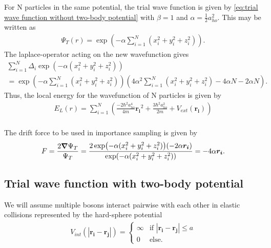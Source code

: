 For N particles in the same potential, the trial wave function is given by \autoref{eq:trial wave function without two-body potential}
with $\beta =1$ and $\alpha =\frac{1}{2}a^2 _{ho}$. This may be written as
\begin{gather*}
	\Psi_T(r) = \exp(-\alpha \sum_{i=1}^N (x_i^2 + y_i^2 + z_i^2)) .
\end{gather*}
The laplace-operator acting on the new wavefunction gives
\begin{gather*}
	\sum_{i=1}^{N} \Delta _{i} \exp(-\alpha (x_i^2+y_i^2+z_i^2)) \\
	=\exp(-\alpha \sum_{i=1}^N (x_i^2 + y_i^2 + z_i^2)) \left(4\alpha^2 \sum_{i=1}^N
	(x_i^2+y_i^2+z_i^2) - 4 \alpha N -2\alpha N \right).
\end{gather*}
Thus, the local energy for the wavefunction of N particles is given by
\begin{gather*}
E_L(r) =   \sum_{i=1}^{N}
\left(\frac{-2\hbar ^2 a _{ho} ^4}{4m}\boldsymbol{r_i}^2 + \frac{3 \hbar ^2
a _{ho}^2}{2m} + V _{ext}(\boldsymbol{r_i}) \right)\\
\end{gather*}

The drift force to be used in importance sampling is given by
\begin{gather*}
	F = \frac{2 \grad \Psi _T}{\Psi _T} = \frac{2\exp(-\alpha (x_i^2+y_i^2+z_i^2))(-2\alpha \boldsymbol{r_i})}{\exp(-\alpha (x_i^2+y_i^2+z_i^2))}
	= -4\alpha \boldsymbol{r_i}.
\end{gather*}

\subsection{Trial wave function with two-body potential}
\label{sec:Trial wave function with two-body potential}
We will assume multiple bosons interact pairwise with each other in elastic collisions
represented by the hard-sphere potential 
\begin{equation}
\label{eq:V_int}
\begin{gathered}
V _{int} (|\boldsymbol{r_i}-\boldsymbol{r_j}|)= 
	\left\{
		\begin{array}{lll}
			\infty & \mbox{if } |\boldsymbol{r_i}-\boldsymbol{r_j}|
			\le a \\
			0 & \mbox{else.} 
		\end{array}
	\right.
\end{gathered}
\end{equation}

